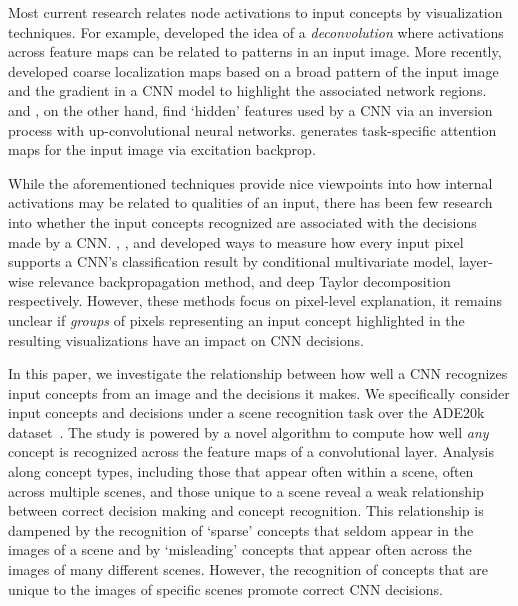 \documentclass{article}
\begin{document}
Most current research relates node activations to input concepts by visualization techniques.
For example, \citet{zeiler2010deconvolutional}
developed the idea of a {\em deconvolution} where activations across
feature maps can be related to patterns in an input 
image. More recently, \citet{selvaraju2016grad} developed coarse localization maps based on a broad pattern of the input image and the gradient in a CNN model to highlight the associated network regions.
\citet{dosovitskiy2016inverting} and \citet{mahendran2015understanding}, on the other hand, find `hidden' features used by a CNN via an inversion process with up-convolutional neural networks. 
\citet{zhang2016top} generates task-specific attention maps for the input image via excitation
backprop. 

While the aforementioned techniques provide nice viewpoints into how internal activations
may be related to qualities of an input, there has been few research into whether 
the input concepts recognized are associated with the decisions made by a CNN. 
\citet{zintgraf2017visualizing}, \citet{bach2015pixel}, and \citet{montavon2017explaining} developed ways to measure how every input pixel supports a CNN's classification result by conditional multivariate model, layer-wise relevance backpropagation method, and deep Taylor decomposition respectively. 
However, these methods focus on pixel-level explanation, 
it remains unclear if {\em groups} of pixels representing an input concept highlighted in the resulting visualizations have an impact on CNN decisions. 



In this paper, we investigate the relationship between how well a CNN recognizes
input concepts from an image and the decisions it makes. 
We specifically consider input concepts and decisions under a scene recognition task over the ADE20k 
dataset~\citep{zhou2017scene}.
The study is powered by a novel algorithm to compute how well {\em any} concept is recognized 
across the feature maps of a convolutional layer. 
Analysis along concept types, including those that appear often within
a scene, often across multiple scenes, and those unique to a scene 
reveal a weak relationship between correct decision making
and concept recognition. This relationship is dampened by 
the recognition of `sparse' concepts that seldom appear in the images of a scene and by `misleading' concepts that
appear often across the images of many different scenes. However, the recognition of concepts that are unique 
to the images of specific scenes promote correct CNN decisions. 
\end{document}
